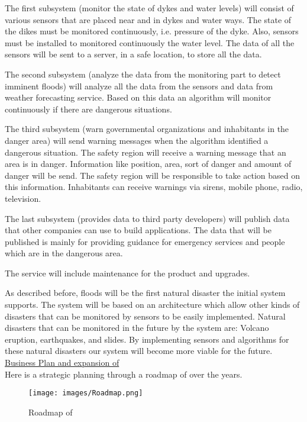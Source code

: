 The first subsystem (monitor the state of dykes and water levels) will consist of various sensors that are placed near and in dykes and water ways. The state of the dikes must be monitored continuously, i.e. pressure of the dyke. Also, sensors must be installed to monitored continuously the water level. The data of all the sensors will be sent to a server, in a safe location, to store all the data.

The second subsystem (analyze the data from the monitoring part to detect imminent floods) will analyze all the data from the sensors and data from weather forecasting service. Based on this data an algorithm will monitor continuously if there are dangerous situations.

The third subsystem (warn governmental organizations and inhabitants in the danger area) will send warning messages when the algorithm identified a dangerous situation. The safety region will receive a warning message that an area is in danger. Information like position, area, sort of danger and amount of danger will be send. The safety region will be responsible to take action based on this information. Inhabitants can receive warnings via sirens, mobile phone, radio, television. %

The last subsystem (provides data to third party developers) will publish data that other companies can use to build applications. The data that will be published is mainly for providing guidance for emergency services and people which are in the dangerous area. 

The service will include maintenance for the product and upgrades.

As described before, floods will be the first natural disaster the initial system supports. The system will be based on an architecture which allow other kinds of disasters that can be monitored by sensors to be easily implemented. Natural disasters that can be monitored in the future by the system are: Volcano eruption, earthquakes, and slides. By implementing sensors and algorithms for these natural disasters our system will become more viable for the future. \\

\underline{Business Plan and expansion of \CompanyName} \\

Here is a strategic planning through a roadmap of \CompanyName over the years.

\begin{figure}[H]
	\centering
	\texttt{[image: images/Roadmap.png]}
	\caption{Roadmap of \CompanyName{}}
	\label{fig:roadmap}
\end{figure}

